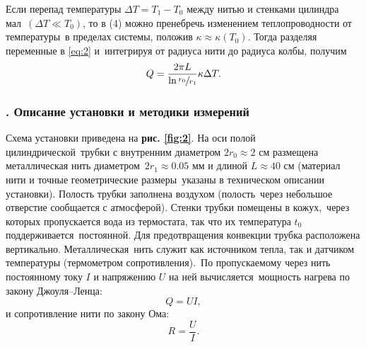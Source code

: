 \documentclass[a4paper, 12pt]{article}
\begin{document}
Если перепад температуры $\Delta T = T_1 - T_0$ между нитью и стенками цилиндра мал\
$(\Delta T \ll T_0)$, то в (4) можно пренебречь изменением теплопроводности от температуры\
в пределах системы, положив $\kappa \approx \kappa(T_0)$. Тогда разделяя переменные в \eqref{eq:2} и\
интегрируя от радиуса нити до радиуса колбы, получим
\begin{equation}
Q = \frac{2 \pi L}{\ln{\sfrac{r_0}{r_1}}}\kappa \Delta T.
\end{equation}

\subsubsection*{\Rnum{2}. Описание установки и методики измерений}
Схема установки приведена на \textbf{рис. \ref{fig:2}}. На оси полой цилиндрической\
трубки с внутренним диаметром $2r_0 \approx 2$ см размещена металлическая нить диаметром\
$2r_1 \approx 0.05$ мм и длиной $L \approx 40$ см (материал нити и точные геометрические размеры\
указаны в техническом описании установки). Полость трубки заполнена воздухом (полость\
через небольшое отверстие сообщается с атмосферой). Стенки трубки помещены в кожух,\
через которых пропускается вода из термостата, так что их температура $t_0$ поддерживается\
постоянной. Для предотвращения конвекции трубка расположена вертикально. Металлическая\
нить служит как источником тепла, так и датчиком температуры (термометром сопротивления).\
По пропускаемому через нить постоянному току $I$ и напряжению $U$ на ней вычисляется\
мощность нагрева по закону Джоуля–Ленца:
\begin{equation}
  Q = UI,
\end{equation}
и сопротивление нити по закону Ома:
\begin{equation}
  R = \frac{U}{I}.
\end{equation}
\end{document}

